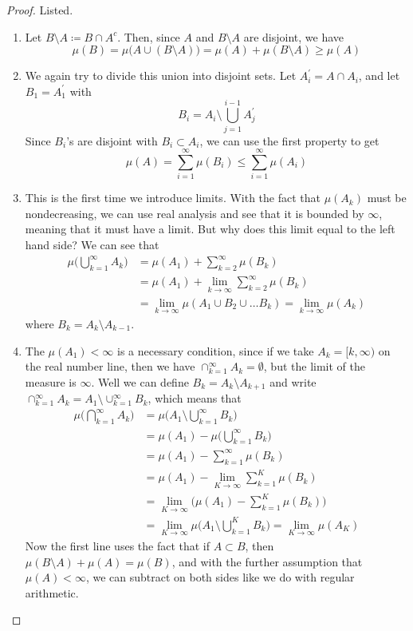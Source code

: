 \documentclass{article}
\theoremstyle{definition}
\theoremstyle{remark}
\theoremstyle{definition}
\begin{document}
\begin{proof}
Listed. 
\begin{enumerate}
    \item Let $B \setminus A \coloneqq B \cap A^c$. Then, since $A$ and $B \setminus A$ are disjoint, we have 
    \[\mu(B) = \mu\big( A \cup (B \setminus A) \big) = \mu(A) + \mu(B \setminus A) \geq \mu(A)\]
    
    \item We again try to divide this union into disjoint sets. Let $A_i^\prime = A \cap A_i$, and let $B_1 = A_1^\prime$ with 
    \[B_i = A_i \setminus \bigcup_{j=1}^{i-1} A^\prime_j\]
    Since $B_i$'s are disjoint with $B_i \subset A_i$, we can use the first property to get 
    \[\mu(A) = \sum_{i=1}^\infty \mu(B_i) \leq \sum_{i=1}^\infty \mu(A_i)\]
    
    \item This is the first time we introduce limits. With the fact that $\mu(A_k)$ must be nondecreasing, we can use real analysis and see that it is bounded by $\infty$, meaning that it must have a limit. But why does this limit equal to the left hand side? We can see that 
    \begin{align}
        \mu\bigg( \bigcup_{k=1}^\infty A_k \bigg) & = \mu(A_1) + \sum_{k=2}^\infty \mu(B_k) \\
        & = \mu(A_1) + \lim_{k \rightarrow \infty} \sum_{k=2}^\infty \mu(B_k) \\
        & = \lim_{k \rightarrow \infty} \mu(A_1 \cup B_2 \cup \ldots B_k)  = \lim_{k \rightarrow \infty} \mu(A_k) 
    \end{align}
    where $B_k = A_k \setminus A_{k-1}$. 
    
    \item The $\mu(A_1) < \infty$ is a necessary condition, since if we take $A_k = [k, \infty)$ on the real number line, then we have $\cap_{k=1}^\infty A_k = \emptyset$, but the limit of the measure is $\infty$. Well we can define $B_k = A_k \setminus A_{k+1}$ and write $\cap_{k=1}^\infty A_k = A_1 \setminus \cup_{k=1}^\infty B_k$, which means that 
    \begin{align*}
        \mu\bigg( \bigcap_{k=1}^\infty A_k \bigg) & = \mu\bigg( A_1 \setminus \bigcup_{k=1}^\infty B_k \bigg) \\
        & = \mu(A_1) - \mu\bigg( \bigcup_{k=1}^\infty B_k\bigg) \\
        & = \mu(A_1) - \sum_{k=1}^\infty \mu(B_k) \\
        & = \mu(A_1) - \lim_{K \rightarrow \infty} \sum_{k=1}^K \mu(B_k) \\
        & = \lim_{K \rightarrow \infty} \bigg( \mu(A_1) - \sum_{k=1}^K \mu(B_k) \bigg) \\
        & = \lim_{K \rightarrow \infty} \mu \bigg( A_1 \setminus \bigcup_{k=1}^K B_k \bigg) = \lim_{K \rightarrow \infty} \mu(A_K)
    \end{align*}
    Now the first line uses the fact that if $A \subset B$, then $\mu(B \setminus A) + \mu(A) = \mu(B)$, and with the further assumption that $\mu(A) < \infty$, we can subtract on both sides like we do with regular arithmetic. 
\end{enumerate}
\end{proof}
\end{document}
